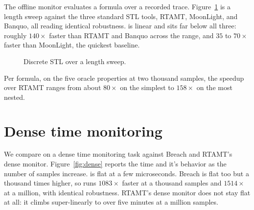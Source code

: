 The offline monitor evaluates a formula over a recorded trace. Figure~\ref{fig:scaling} is a length sweep against the three standard STL tools, RTAMT, MoonLight, and Banquo, all reading identical robustness. \sentil{} is linear and sits far below all three: roughly $140\times$ faster than RTAMT and Banquo across the range, and $35$ to $70\times$ faster than MoonLight, the quickest baseline.

\begin{figure}[h]
\centering
\begin{widefig}\end{widefig}
\caption{Discrete STL over a length sweep.}
\label{fig:scaling}
\end{figure}

Per formula, on the five oracle properties at two thousand samples, the speedup over RTAMT ranges from about $80\times$ on the simplest to $158\times$ on the most nested.

\section{Dense time monitoring}

We compare \sentil{} on a dense time monitoring task against Breach and RTAMT's dense monitor. Figure~\ref{fig:dense} reports the time and it's behavior as the number of samples increase. \sentil{} is flat at a few microseconds. Breach is flat too but a thousand times higher, so \sentil{} runs $1083\times$ faster at a thousand samples and $1514\times$ at a million, with identical robustness. RTAMT's dense monitor does not stay flat at all: it climbs super-linearly to over five minutes at a million samples.

